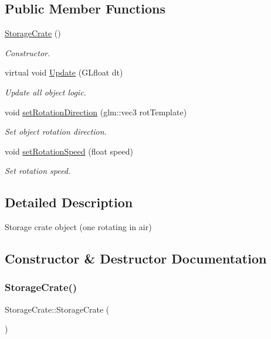 \subsection*{Public Member Functions}
\begin{DoxyCompactItemize}
\item 
\mbox{\hyperlink{class_storage_crate_a057b9d2797b3e1e901473b7edcb9c572}{Storage\+Crate}} ()
\begin{DoxyCompactList}\small\item\em Constructor. \end{DoxyCompactList}\item 
virtual void \mbox{\hyperlink{class_storage_crate_a44efdd9b2cb799a3667667bbd83be376}{Update}} (G\+Lfloat dt)
\begin{DoxyCompactList}\small\item\em Update all object logic. \end{DoxyCompactList}\item 
void \mbox{\hyperlink{class_storage_crate_ad0e3a1eabd7fdca9bb8bf2d7106cafab}{set\+Rotation\+Direction}} (glm\+::vec3 rot\+Template)
\begin{DoxyCompactList}\small\item\em Set object rotation direction. \end{DoxyCompactList}\item 
void \mbox{\hyperlink{class_storage_crate_ae68f13fa51f9306b641fbb8944eae60c}{set\+Rotation\+Speed}} (float speed)
\begin{DoxyCompactList}\small\item\em Set rotation speed. \end{DoxyCompactList}\end{DoxyCompactItemize}


\subsection{Detailed Description}
Storage crate object (one rotating in air) 

\subsection{Constructor \& Destructor Documentation}
\mbox{\label{class_storage_crate_a057b9d2797b3e1e901473b7edcb9c572}} 
\subsubsection{\texorpdfstring{StorageCrate()}{StorageCrate()}}
{\footnotesize\ttfamily Storage\+Crate\+::\+Storage\+Crate (\begin{DoxyParamCaption}{ }\end{DoxyParamCaption})}



